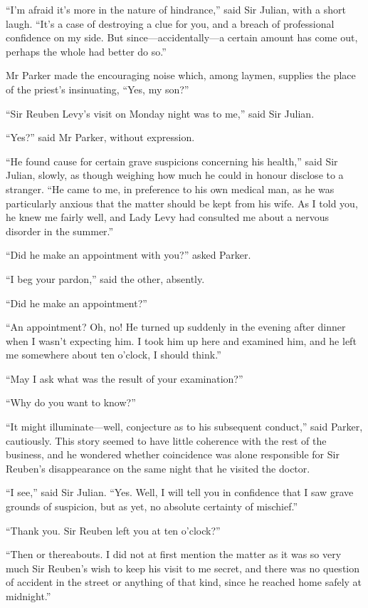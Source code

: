 \enquote{I’m afraid it’s more in the nature of hindrance,} said Sir Julian, with a short laugh. \enquote{It’s a case of destroying a clue for you, and a breach of professional confidence on my side. But since\allowbreak---\allowbreak accidentally---a certain amount has come out, perhaps the whole had better do so.}

Mr Parker made the encouraging noise which, among laymen, supplies the place of the priest’s insinuating, \enquote{Yes, my son?}

\enquote{Sir Reuben Levy’s visit on Monday night was to me,} said Sir Julian.

\enquote{Yes?} said Mr Parker, without expression.

\enquote{He found cause for certain grave suspicions concerning his health,} said Sir Julian, slowly, as though weighing how much he could in honour disclose to a stranger. \enquote{He came to me, in preference to his own medical man, as he was particularly anxious that the matter should be kept from his wife. As I told you, he knew me fairly well, and Lady Levy had consulted me about a nervous disorder in the summer.}

\enquote{Did he make an appointment with you?} asked Parker.

\enquote{I beg your pardon,} said the other, absently.

\enquote{Did he make an appointment?}

\enquote{An appointment? Oh, no! He turned up suddenly in the evening after dinner when I wasn’t expecting him. I took him up here and examined him, and he left me somewhere about ten o’clock, I should think.}

\enquote{May I ask what was the result of your examination?}

\enquote{Why do you want to know?}

\enquote{It might illuminate\allowbreak---\allowbreak well, conjecture as to his subsequent conduct,} said Parker, cautiously. This story seemed to have little coherence with the rest of the business, and he wondered whether coincidence was alone responsible for Sir Reuben’s disappearance on the same night that he visited the doctor.

\enquote{I see,} said Sir Julian. \enquote{Yes. Well, I will tell you in confidence that I saw grave grounds of suspicion, but as yet, no absolute certainty of mischief.}

\enquote{Thank you. Sir Reuben left you at ten o’clock?}

\enquote{Then or thereabouts. I did not at first mention the matter as it was so very much Sir Reuben’s wish to keep his visit to me secret, and there was no question of accident in the street or anything of that kind, since he reached home safely at midnight.}

